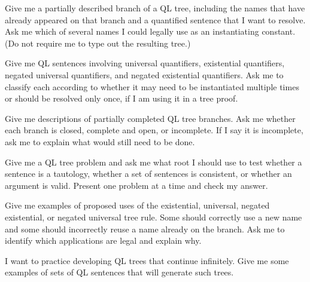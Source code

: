 \begin{genaipractice}[]

\item Give me a partially described branch of a QL tree, including the names that have already appeared on that branch and a quantified sentence that I want to resolve. Ask me which of several names I could legally use as an instantiating constant. (Do not require me to type out the resulting tree.)

\item Give me QL sentences involving universal quantifiers, existential quantifiers, negated universal quantifiers, and negated existential quantifiers. Ask me to classify each according to whether it may need to be instantiated multiple times or should be resolved only once, if I am using it in a tree proof.

\item Give me descriptions of partially completed QL tree branches. Ask me whether each branch is closed, complete and open, or incomplete. If I say it is incomplete, ask me to explain what would still need to be done.

\item Give me a QL tree problem and ask me what root I should use to test whether a sentence is a tautology, whether a set of sentences is consistent, or whether an argument is valid. Present one problem at a time and check my answer.

\item Give me examples of proposed uses of the existential, universal, negated existential, or negated universal tree rule. Some should correctly use a new name and some should incorrectly reuse a name already on the branch. Ask me to identify which applications are legal and explain why.

\item I want to practice developing QL trees that continue infinitely. Give me some examples of sets of QL sentences that will generate such trees.

\end{genaipractice}